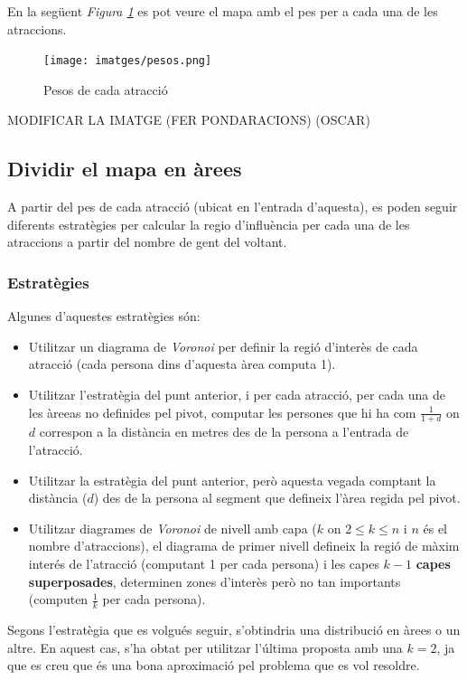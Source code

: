 \documentclass[12pt]{article}
\begin{document}
En la següent \textit{Figura \ref{fig:mapa_areas}} es pot veure el mapa amb el pes per a cada una de les atraccions.

\begin{figure}[H]
	\centering
	\texttt{[image: imatges/pesos.png]}\par\vspace{1cm}
	\caption{Pesos de cada atracció}
	\label{fig:mapa_areas}
\end{figure}

MODIFICAR LA IMATGE (FER PONDARACIONS) (OSCAR)

\subsection{Dividir el mapa en àrees \label{arees}}
A partir del pes de cada atracció (ubicat en l'entrada d'aquesta), es poden seguir diferents estratègies per calcular la regio d'influència per cada una de les atraccions a partir del nombre de gent del voltant.

\subsubsection{Estratègies}
Algunes d'aquestes estratègies són:
\begin{itemize}
	\item Utilitzar un diagrama de \textit{Voronoi} per definir la regió d'interès de cada atracció (cada persona dins d'aquesta àrea computa 1).
	\item Utilitzar l'estratègia del punt anterior, i per cada atracció, per cada una de les àreeas no definides pel pivot, computar les persones que hi ha com $\frac{1}{1+d}$ on $d$ correspon a la distància en metres des de la persona a l'entrada de l'atracció.
	\item Utilitzar la estratègia del punt anterior, però aquesta vegada comptant la distància ($d$) des de la persona al segment que defineix l'àrea regida pel pivot.
	\item Utilitzar diagrames de \textit{Voronoi} de nivell amb capa ($k$ on $2 \le k \le n$ i $n$ és el nombre d'atraccions), el diagrama de primer nivell defineix la regió de màxim interés de l'atracció (computant 1 per cada persona) i les capes $k-1$ \textbf{capes superposades}, determinen zones d'interès però no tan importants (computen $\frac{1}{k}$ per cada persona).
\end{itemize}

Segons l'estratègia que es volgués seguir, s'obtindria una distribució en àrees o un altre. En aquest cas, s'ha obtat per utilitzar l'última proposta amb una $k = 2$, ja que es creu que és una bona aproximació pel problema que es vol resoldre. 
\end{document}
